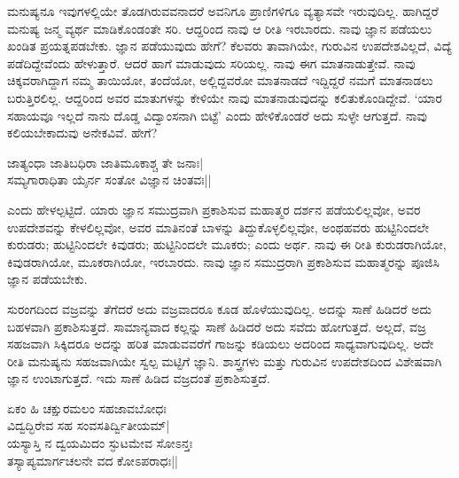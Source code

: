 ಮನುಷ್ಯನೂ ಇವುಗಳಲ್ಲಿಯೇ ತೊಡಗಿರುವವನಾದರೆ ಅವನಿಗೂ ಪ್ರಾಣಿಗಳಿಗೂ ವ್ಯತ್ಯಾಸವೇ ಇರುವುದಿಲ್ಲ. ಹಾಗಿದ್ದರೆ ಮನುಷ್ಯ ಜನ್ಮ ವ್ಯರ್ಥ 
ಮಾಡಿಕೊಂಡಂತೇ ಸರಿ. ಆದ್ದರಿಂದ ನಾವು ಆ ರೀತಿ ಇರಬಾರದು. ನಾವು ಜ್ಞಾನ ಪಡೆಯಲು ಖಂಡಿತ ಪ್ರಯತ್ನಪಡಬೇಕು. ಜ್ಞಾನ ಪಡೆಯುವುದು ಹೇಗೆ? ಕೆಲವರು 
ತಾವಾಗಿಯೇ, ಗುರುವಿನ ಉಪದೇಶವಿಲ್ಲದೆ, ವಿದ್ಯೆ  ಪಡೆದಿದ್ದೇವೆಂದು ಹೇಳುತ್ತಾರೆ. ಆದರೆ ಹಾಗೆ ಮಾಡುವುದು ಸರಿಯಲ್ಲ. ನಾವು ಈಗ ಮಾತನಾಡುತ್ತೇವೆ. ನಾವು 
ಚಿಕ್ಕವರಾಗಿದ್ದಾಗ ನಮ್ಮ ತಾಯಿಯೋ, ತಂದೆಯೋ, ಅಲ್ಲಿದ್ದವರೋ ಮಾತನಾಡದೆ ಇದ್ದಿದ್ದರೆ ನಮಗೆ ಮಾತನಾಡಲು ಬರುತ್ತಿರಲಿಲ್ಲ. ಆದ್ದರಿಂದ 
ಅವರ ಮಾತುಗಳನ್ನು ಕೇಳಿಯೇ ನಾವು ಮಾತನಾಡುವುದನ್ನು ಕಲಿತುಕೊಂಡಿದ್ದೇವೆ. `ಯಾರ ಸಹಾಯವೂ ಇಲ್ಲದೆ ನಾನು ದೊಡ್ಡ ವಿದ್ವಾಂಸನಾಗಿ ಬಿಟ್ಟೆ' ಎಂದು 
ಹೇಳಿಕೊಂಡರೆ ಅದು ಸುಳ್ಳೇ ಆಗುತ್ತದೆ. ನಾವು ಕಲಿಯಬೇಕಾದುವು ಅನೇಕವಿವೆ. ಹೇಗೆ?

\begin{shloka}
ಜಾತ್ಯಂಧಾ ಜಾತಿಬಧಿರಾ ಜಾತಿಮೂಕಾಶ್ಚ ತೇ ಜನಾಃ|\\
ಸಮ್ಯಗಾರಾಧಿತಾ ಯೈರ್ನ ಸಂತೋ ವಿಜ್ಞಾನ ಚಿಂತವಃ||
\end{shloka}

ಎಂದು ಹೇಳಲ್ಪಟ್ಟಿದೆ. ಯಾರು ಜ್ಞಾನ ಸಮುದ್ರವಾಗಿ ಪ್ರಕಾಶಿಸುವ ಮಹಾತ್ಮರ ದರ್ಶನ ಪಡೆಯಲಿಲ್ಲವೋ, ಅವರ ಉಪದೇಶವನ್ನು ಕೇಳಲಿಲ್ಲವೋ, 
ಅವರ ಮಾತಿನಂತೆ ಬಾಳನ್ನು ತಿದ್ದುಕೊಳ್ಳಲಿಲ್ಲವೋ, ಅಂಥಹವರು ಹುಟ್ಟಿನಿಂದಲೇ ಕುರುಡರು; ಹುಟ್ಟಿನಿಂದಲೇ ಕಿವುಡರು; ಹುಟ್ಟಿನಿಂದಲೇ 
ಮೂಕರು; ಎಂದು ಅರ್ಥ. ನಾವು ಈ ರೀತಿ ಕುರುಡರಾಗಿಯೋ, ಕಿವುಡರಾಗಿಯೋ, ಮೂಕರಾಗಿಯೋ, ಇರಬಾರದು. ನಾವು ಜ್ಞಾನ 
ಸಮುದ್ರರಾಗಿ ಪ್ರಕಾಶಿಸುವ ಮಹಾತ್ಮರನ್ನು ಪೂಜಿಸಿ ಜ್ಞಾನ ಪಡೆಯಬೇಕು.

ಸುರಂಗದಿಂದ ವಜ್ರವನ್ನು ತೆಗೆದರೆ ಅದು ವಜ್ರವಾದರೂ ಕೂಡ ಹೊಳೆಯುವುದಿಲ್ಲ. ಅದನ್ನು ಸಾಣೆ ಹಿಡಿದರೆ ಅದು ಬಹಳವಾಗಿ ಪ್ರಕಾಶಿಸುತ್ತದೆ. 
ಸಾಮಾನ್ಯವಾದ ಕಲ್ಲನ್ನು ಸಾಣೆ ಹಿಡಿದರೆ ಅದು ಸವೆದು ಹೋಗುತ್ತದೆ. ಅಲ್ಲದೆ, ವಜ್ರ ಸಹಜವಾಗಿ ಸಿಕ್ಕಿದರೂ ಅದನ್ನು ಹರಿತ ಮಾಡುವವರೆಗೆ ಗಾಜನ್ನು 
ಕಡಿಯಲು ಅದರಿಂದ ಸಾಧ್ಯವಾಗುವುದಿಲ್ಲ. ಅದೇ ರೀತಿ ಮನುಷ್ಯನು ಸಹಜವಾಗಿಯೇ ಸ್ವಲ್ಪ ಮಟ್ಟಿಗೆ ಜ್ಞಾನಿ. ಶಾಸ್ತ್ರಗಳು ಮತ್ತು ಗುರುವಿನ 
ಉಪದೇಶದಿಂದ ವಿಶೇಷವಾಗಿ ಜ್ಞಾನ ಉಂಟಾಗುತ್ತದೆ. ಇದು ಸಾಣೆ ಹಿಡಿದ ವಜ್ರದಂತೆ ಪ್ರಕಾಶಿಸುತ್ತದೆ.

\begin{shloka}
ಏಕಂ ಹಿ ಚಕ್ಷುರಮಲಂ ಸಹಜಾವಬೋಧಃ\\
ವಿದ್ವದ್ಭಿರೇವ ಸಹ ಸಂವಸತಿರ್ದ್ವಿತೀಯಮ್|\\
ಯಸ್ಯಾಸ್ತಿ ನ ದ್ವಯಮಿದಂ ಸ್ಫುಟಮೇವ ಸೋಽನ್ತಃ\\
ತಸ್ಯಾಪ್ಯಮಾರ್ಗಚಲನೇ ವದ ಕೋಽಪರಾಧಃ||
\end{shloka}


